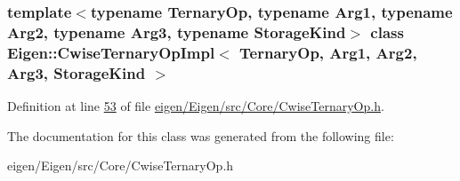 \subsubsection*{template$<$typename Ternary\+Op, typename Arg1, typename Arg2, typename Arg3, typename Storage\+Kind$>$\newline
class Eigen\+::\+Cwise\+Ternary\+Op\+Impl$<$ Ternary\+Op, Arg1, Arg2, Arg3, Storage\+Kind $>$}



Definition at line \hyperlink{eigen_2_eigen_2src_2_core_2_cwise_ternary_op_8h_source_l00053}{53} of file \hyperlink{eigen_2_eigen_2src_2_core_2_cwise_ternary_op_8h_source}{eigen/\+Eigen/src/\+Core/\+Cwise\+Ternary\+Op.\+h}.



The documentation for this class was generated from the following file\+:\begin{DoxyCompactItemize}
\item 
eigen/\+Eigen/src/\+Core/\+Cwise\+Ternary\+Op.\+h\end{DoxyCompactItemize}
